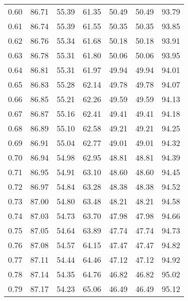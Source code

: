 \begin{tabular}{|c|c|c|c|c|c|c|}
      0.60 &     86.71 &     55.39 &      61.35 &   50.49 &      50.49 &         93.79 \\
      0.61 &     86.74 &     55.39 &      61.55 &   50.35 &      50.35 &         93.85 \\
      0.62 &     86.76 &     55.34 &      61.68 &   50.18 &      50.18 &         93.91 \\
      0.63 &     86.78 &     55.31 &      61.80 &   50.06 &      50.06 &         93.95 \\
      0.64 &     86.81 &     55.31 &      61.97 &   49.94 &      49.94 &         94.01 \\
      0.65 &     86.83 &     55.28 &      62.14 &   49.78 &      49.78 &         94.07 \\
      0.66 &     86.85 &     55.21 &      62.26 &   49.59 &      49.59 &         94.13 \\
      0.67 &     86.87 &     55.16 &      62.41 &   49.41 &      49.41 &         94.18 \\
      0.68 &     86.89 &     55.10 &      62.58 &   49.21 &      49.21 &         94.25 \\
      0.69 &     86.91 &     55.04 &      62.77 &   49.01 &      49.01 &         94.32 \\
      0.70 &     86.94 &     54.98 &      62.95 &   48.81 &      48.81 &         94.39 \\
      0.71 &     86.95 &     54.91 &      63.10 &   48.60 &      48.60 &         94.45 \\
      0.72 &     86.97 &     54.84 &      63.28 &   48.38 &      48.38 &         94.52 \\
      0.73 &     87.00 &     54.80 &      63.48 &   48.21 &      48.21 &         94.58 \\
      0.74 &     87.03 &     54.73 &      63.70 &   47.98 &      47.98 &         94.66 \\
      0.75 &     87.05 &     54.64 &      63.89 &   47.74 &      47.74 &         94.73 \\
      0.76 &     87.08 &     54.57 &      64.15 &   47.47 &      47.47 &         94.82 \\
      0.77 &     87.11 &     54.44 &      64.46 &   47.12 &      47.12 &         94.92 \\
      0.78 &     87.14 &     54.35 &      64.76 &   46.82 &      46.82 &         95.02 \\
      0.79 &     87.17 &     54.23 &      65.06 &   46.49 &      46.49 &         95.12 \\

\end{tabular}
